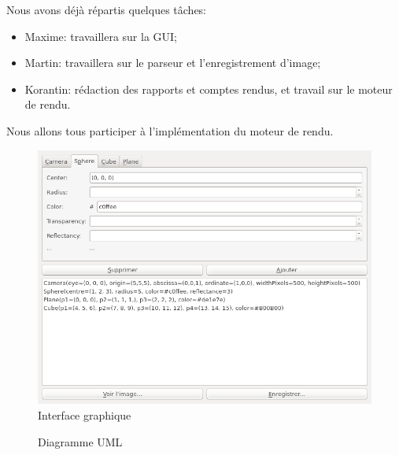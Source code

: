 \documentclass[a4paper]{article}
\begin{document}
  Nous avons déjà répartis quelques tâches:
  \begin{itemize}
    \item Maxime: travaillera sur la GUI;
    \item Martin: travaillera sur le parseur et l'enregistrement d'image;
    \item Korantin: rédaction des rapports et comptes rendus, et travail
      sur le moteur de rendu.
  \end{itemize}

  Nous allons tous participer à l'implémentation du moteur de rendu.

    \begin{figure}[p]
      \centerline{\includegraphics[width=1.2\textwidth]{gui.png}}
    \caption{Interface graphique\label{fig:gui}}
    \end{figure}

    \begin{landscape}
      \thispagestyle{empty}
      \begin{figure}[p]
        \caption{Diagramme UML\label{fig:uml}}
      \end{figure}
    \end{landscape}
    \restoregeometry
\end{document}
